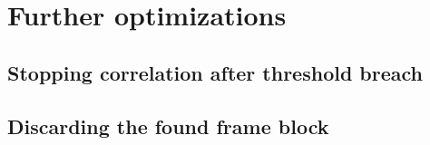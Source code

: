 

\section{Further optimizations}

\subsection{Stopping correlation after threshold breach}
\subsection{Discarding the found frame block}

